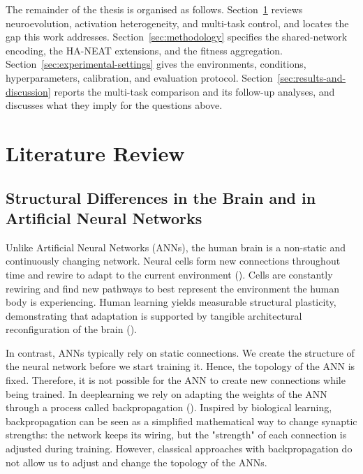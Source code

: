 \documentclass[12pt]{article}
\begin{document}
The remainder of the thesis is organised as follows.
Section~\ref{sec:literature-review} reviews neuroevolution, activation heterogeneity, and multi-task control, and locates the gap this work addresses.
Section~\ref{sec:methodology} specifies the shared-network encoding, the HA-NEAT extensions, and the fitness aggregation.
Section~\ref{sec:experimental-settings} gives the environments, conditions, hyperparameters, calibration, and evaluation protocol.
Section~\ref{sec:results-and-discussion} reports the multi-task comparison and its follow-up analyses, and discusses what they imply for the questions above.

\newpage
\section{Literature Review}
\label{sec:literature-review}


\subsection{Structural Differences in the Brain and in Artificial Neural Networks}
\label{subsec:structural-differences-in-the-brain-and}


Unlike Artificial Neural Networks (ANNs), the human brain is a non-static and continuously changing network.
Neural cells form new connections throughout time and rewire to adapt to the current environment (\cite{pascualleone_plastic_2005,holtmaat_experience-dependent_2009}).
Cells are constantly rewiring and find new pathways to best represent the environment the human body is experiencing.
Human learning yields measurable structural plasticity, demonstrating that adaptation is supported by tangible architectural reconfiguration of the brain (\cite{draganski_changes_2004}).

In contrast, ANNs typically rely on static connections.
We create the structure of the neural network before we start training it.
Hence, the topology of the ANN is fixed.
Therefore, it is not possible for the ANN to create new connections while being trained.
In deeplearning we rely on adapting the weights of the ANN through a process called backpropagation (\cite{rumelhart_learning_1986}).
Inspired by biological learning, backpropagation can be seen as a simplified mathematical way to change synaptic strengths: the network keeps its wiring, but the "strength" of each connection is adjusted during training.
However, classical approaches with backpropagation do not allow us to adjust and change the topology of the ANNs.
\end{document}

